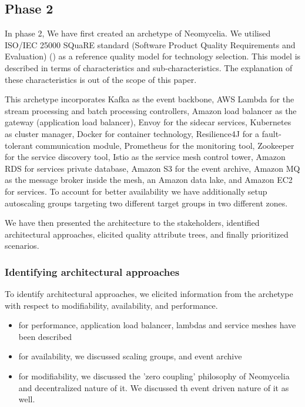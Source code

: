 \documentclass[conference]{IEEEtran}
\begin{document}
\subsection{Phase 2}

In phase 2, We have first created an archetype of Neomycelia. We utilised ISO/IEC 25000 SQuaRE standard (Software Product Quality Requirements and Evaluation) (\cite{Iso}) as a reference quality model for technology selection. This model is described in terms of characteristics and sub-characteristics. The explanation of these characteristics is out of the scope of this paper.

This archetype incorporates Kafka as the event backbone, AWS Lambda for the stream processing and batch processing controllers, Amazon load balancer as the gateway (application load balancer), Envoy for the sidecar services, Kubernetes as cluster manager, Docker for container technology, Resilience4J for a fault-tolerant communication module, Prometheus for the monitoring tool, Zookeeper for the service discovery tool, Istio as the service mesh control tower, Amazon RDS for services private database, Amazon S3 for the event archive, Amazon MQ as the message broker inside the mesh, an Amazon data lake, and Amazon EC2 for services. To account for better availability we have additionally setup autoscaling groups targeting two different target groups in two different zones.

We have then presented the architecture to the stakeholders, identified architectural approaches, elicited quality attribute trees, and finally prioritized scenarios.

\subsubsection{Identifying architectural approaches}

To identify architectural approaches, we elicited information from the archetype with respect to modifiability, availability, and performance.

\begin{itemize}
    \item for performance, application load balancer, lambdas and service meshes have been described
    \item for availability, we discussed scaling groups, and event archive
    \item for modifiability, we discussed the 'zero coupling' philosophy of Neomycelia and decentralized nature of it. We discussed th event driven nature of it as well.
\end{itemize}
\end{document}
